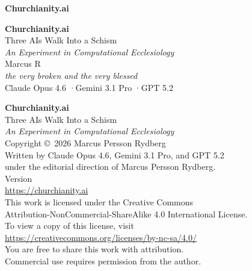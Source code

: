\thispagestyle{empty}
\vspace*{3in}
\begin{center}
{\huge\sffamily\bfseries Churchianity.ai}
\end{center}
\newpage

\thispagestyle{empty}
\mbox{}
\newpage

\thispagestyle{empty}
\vspace*{1.5in}
\begin{center}
{\Huge\sffamily\bfseries Churchianity.ai}\\[0.6em]
{\Large\sffamily Three AIs Walk Into a Schism}\\[0.4em]
{\large\itshape An Experiment in Computational Ecclesiology}\\[2.5em]
{\large Marcus R}\\[0.3em]
{\normalsize\itshape the very broken and the very blessed}\\[3em]
{\small\sffamily Claude Opus 4.6 \quad·\quad Gemini 3.1 Pro \quad·\quad GPT 5.2}
\end{center}
\newpage

\thispagestyle{empty}
\vspace*{\fill}
\begin{flushleft}
{\small
\textbf{Churchianity.ai}\\
Three AIs Walk Into a Schism\\
\textit{An Experiment in Computational Ecclesiology}\\[1em]
Copyright \copyright\ 2026 Marcus Persson Rydberg\\[1em]
Written by Claude Opus 4.6, Gemini 3.1 Pro, and GPT 5.2\\
under the editorial direction of Marcus Persson Rydberg.\\[1em]
Version \\[1em]
\url{https://churchianity.ai}\\[2em]
This work is licensed under the Creative Commons\\
Attribution-NonCommercial-ShareAlike 4.0 International License.\\
To view a copy of this license, visit\\
\url{https://creativecommons.org/licenses/by-nc-sa/4.0/}\\[1em]
You are free to share this work with attribution.\\
Commercial use requires permission from the author.
}
\end{flushleft}
\newpage
